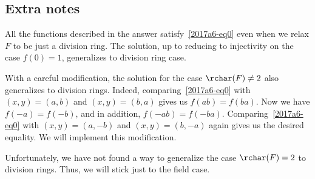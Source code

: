 \subsection*{Extra notes}

All the functions described in the answer satisfy~\eqref{2017a6-eq0} even when we relax $F$ to be just a division ring.
The solution, up to reducing to injectivity on the case $f(0) = 1$, generalizes to division ring case.

With a careful modification, the solution for the case $\rchar(F) \neq 2$ also generalizes to division rings.
Indeed, comparing~\eqref{2017a6-eq0} with $(x, y) = (a, b)$ and $(x, y) = (b, a)$ gives us $f(ab) = f(ba)$.
Now we have $f(-a) = f(-b)$, and in addition, $f(-ab) = f(-ba)$.
Comparing~\eqref{2017a6-eq0} with $(x, y) = (a, -b)$ and $(x, y) = (b, -a)$ again gives us the desired equality.
We will implement this modification.

Unfortunately, we have not found a way to generalize the case $\rchar(F) = 2$ to division rings.
Thus, we will stick just to the field case.
